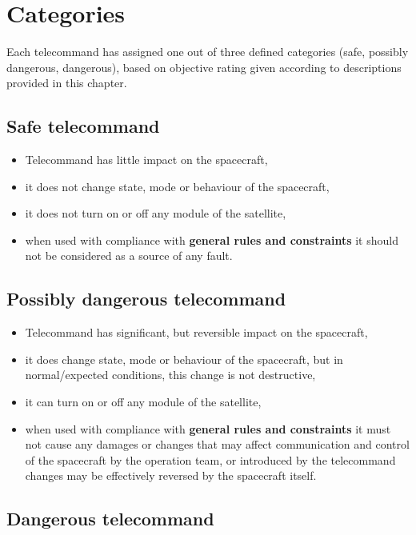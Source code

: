 \section{Categories}

Each telecommand has assigned one out of three defined categories (safe, possibly dangerous, dangerous), based on objective rating given according to descriptions provided in this chapter.

\subsection{Safe telecommand}

\begin{itemize}
    \item Telecommand has little impact on the spacecraft,
    \item it does not change state, mode or behaviour of the spacecraft,
    \item it does not turn on or off any module of the satellite,
    \item when used with compliance with \textbf{general rules and constraints} it should not be considered as a source of any fault.
\end{itemize}

\subsection{Possibly dangerous telecommand}

\begin{itemize}
    \item Telecommand has significant, but reversible impact on the spacecraft,
    \item it does change state, mode or behaviour of the spacecraft, but in normal/expected conditions, this change is not destructive,
    \item it can turn on or off any module of the satellite,
    \item when used with compliance with \textbf{general rules and constraints} it must not cause any damages or changes that may affect communication and control of the spacecraft by the operation team, or introduced by the telecommand changes may be effectively reversed by the spacecraft itself.
\end{itemize}


\subsection{Dangerous telecommand}

